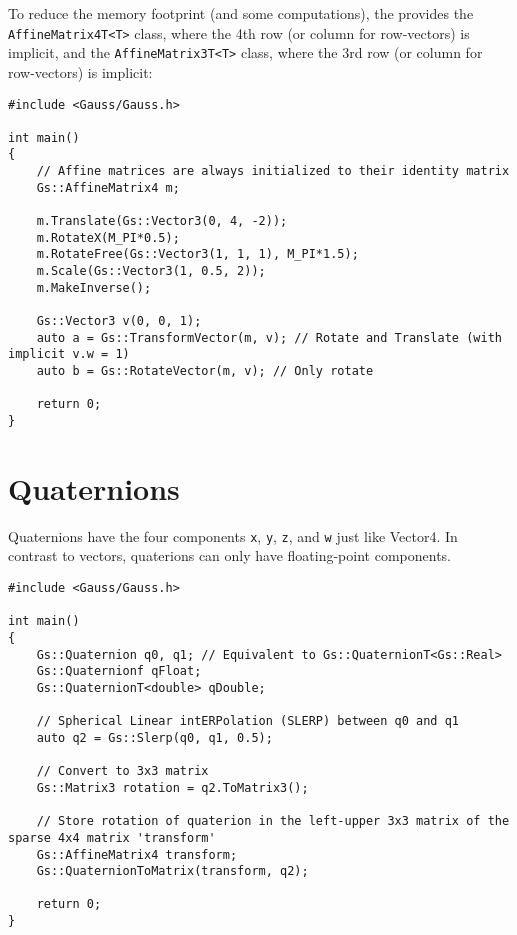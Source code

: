 \documentclass{article}
\begin{document}
To reduce the memory footprint (and some computations), the \gausslib provides the \texttt{AffineMatrix4T<T>} class,
where the 4th row (or column for row-vectors) is implicit, and the \texttt{AffineMatrix3T<T>} class,
where the 3rd row (or column for row-vectors) is implicit:
\begin{lstlisting}
#include <Gauss/Gauss.h>

int main()
{
	// Affine matrices are always initialized to their identity matrix
	Gs::AffineMatrix4 m;
	
	m.Translate(Gs::Vector3(0, 4, -2));
	m.RotateX(M_PI*0.5);
	m.RotateFree(Gs::Vector3(1, 1, 1), M_PI*1.5);
	m.Scale(Gs::Vector3(1, 0.5, 2));
	m.MakeInverse();
	
	Gs::Vector3 v(0, 0, 1);
	auto a = Gs::TransformVector(m, v); // Rotate and Translate (with implicit v.w = 1)
	auto b = Gs::RotateVector(m, v); // Only rotate
	
	return 0;
}
\end{lstlisting}



\section*{Quaternions}

Quaternions have the four components \texttt{x}, \texttt{y}, \texttt{z}, and \texttt{w} just like Vector4.
In contrast to vectors, quaterions can only have floating-point components.
\begin{lstlisting}
#include <Gauss/Gauss.h>

int main()
{
	Gs::Quaternion q0, q1; // Equivalent to Gs::QuaternionT<Gs::Real>
	Gs::Quaternionf qFloat;
	Gs::QuaternionT<double> qDouble;
	
	// Spherical Linear intERPolation (SLERP) between q0 and q1
	auto q2 = Gs::Slerp(q0, q1, 0.5);
	
	// Convert to 3x3 matrix
	Gs::Matrix3 rotation = q2.ToMatrix3();
	
	// Store rotation of quaterion in the left-upper 3x3 matrix of the sparse 4x4 matrix 'transform'
	Gs::AffineMatrix4 transform;
	Gs::QuaternionToMatrix(transform, q2);
	
	return 0;
}
\end{lstlisting}


\end{document}
